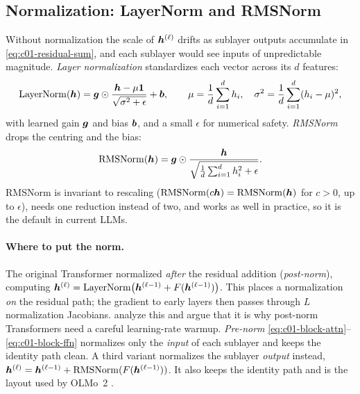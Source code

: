 \subsection{Normalization: LayerNorm and RMSNorm}\label{sec:c01-norm}

Without normalization the scale of $\bm{h}^{(\ell)}$ drifts as sublayer outputs accumulate in
\eqref{eq:c01-residual-sum}, and each sublayer would see inputs of unpredictable magnitude.
\emph{Layer normalization} \citep{c01-ba2016layernorm} standardizes each vector across its
$d$ features:
\begin{equation}\label{eq:c01-layernorm}
  \operatorname{LayerNorm}(\bm{h}) = \bm{g} \odot \frac{\bm{h} - \mu \bm{1}}{\sqrt{\sigma^2 + \epsilon}} + \bm{b},
  \qquad
  \mu = \frac{1}{d}\sum_{i=1}^{d} h_i,\quad
  \sigma^2 = \frac{1}{d}\sum_{i=1}^{d}(h_i - \mu)^2,
\end{equation}
with learned gain $\bm{g}$ and bias $\bm{b}$, and a small $\epsilon$ for numerical safety.
\emph{RMSNorm} \citep{c01-zhang2019rmsnorm} drops the centring and the bias:
\begin{equation}\label{eq:c01-rmsnorm}
  \operatorname{RMSNorm}(\bm{h}) = \bm{g} \odot \frac{\bm{h}}{\sqrt{\frac{1}{d}\sum_{i=1}^{d} h_i^2 + \epsilon}} .
\end{equation}
RMSNorm is invariant to rescaling ($\operatorname{RMSNorm}(c\bm{h}) = \operatorname{RMSNorm}(\bm{h})$ for $c > 0$, up to
$\epsilon$), needs one reduction instead of two, and works as well in practice, so it is the
default in current LLMs.

\paragraph{Where to put the norm.} The original Transformer normalized \emph{after} the
residual addition (\emph{post-norm}), computing
$\bm{h}^{(\ell)} = \operatorname{LayerNorm}\bigl(\bm{h}^{(\ell-1)} + F(\bm{h}^{(\ell-1)})\bigr)$. This places a
normalization \emph{on} the residual path; the gradient to early layers then passes through
$L$ normalization Jacobians. \citet{c01-xiong2020prenorm} analyze this and argue that it is
why post-norm Transformers need a careful learning-rate warmup. \emph{Pre-norm}
\eqref{eq:c01-block-attn}--\eqref{eq:c01-block-ffn} normalizes only the \emph{input} of each
sublayer and keeps the identity path clean. A third variant normalizes the sublayer
\emph{output} instead, $\bm{h}^{(\ell)} = \bm{h}^{(\ell-1)} + \operatorname{RMSNorm}(F(\bm{h}^{(\ell-1)}))$. It
also keeps the identity path and is the layout used by OLMo~2 \citep{c01-olmo2024olmo2}.


